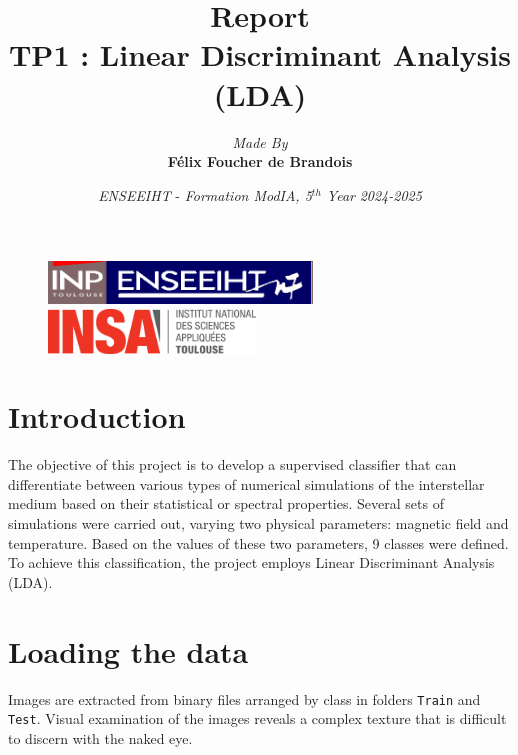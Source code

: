 \documentclass[12pt,a4paper]{article}
\title{\vspace{4cm}
        Report \\
        \vspace{1cm} \textbf{TP1 : Linear Discriminant Analysis (LDA)} \\ 
        \vspace{4cm} 
}
\author{\textit{Made By} \vspace{0.5cm}\\
        \textbf{Félix Foucher de Brandois}
}
\date{\vfill
        \textit{ENSEEIHT} - 
        \textit{Formation ModIA, 5$^{th}$ Year}
        \hfill
        \textit{2024-2025} \\
        \vspace{1cm}
}
\begin{document}
\begin{figure}[t]
    \centering
    \includegraphics[width=7cm]{src/inp_n7.png}
    \hfill
    \includegraphics[width=5.5cm]{src/insa_toulouse.png}
\end{figure}


\maketitle
\thispagestyle{empty}

\newpage


\section{Introduction}

The objective of this project is to develop a supervised classifier that can differentiate between various types of numerical simulations of the interstellar medium based on their statistical or spectral properties.
Several sets of simulations were carried out, varying two physical parameters: magnetic field and temperature.
Based on the values of these two parameters, 9 classes were defined. \\
To achieve this classification, the project employs Linear Discriminant Analysis (LDA).



\section{Loading the data}

Images are extracted from binary files arranged by class in folders \texttt{Train} and \texttt{Test}.
Visual examination of the images reveals a complex texture that is difficult to discern with the naked eye.
\end{document}
